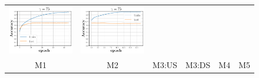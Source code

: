 \begin{figure}[h]
\begin{minipage}{0.99\columnwidth}
{\begin{tabular}{cccccc}
\includegraphics[scale=0.125]{figs/relu_75_good.pdf}&
\includegraphics[scale=0.125]{figs/galu_75_recovered.pdf}\\
\tiny{M1}&\tiny{M2}&\tiny{M3:US}&\tiny{M3:DS}&\tiny{M4}&\tiny{M5}\\
\end{tabular}
}
\end{minipage}



\end{figure}

